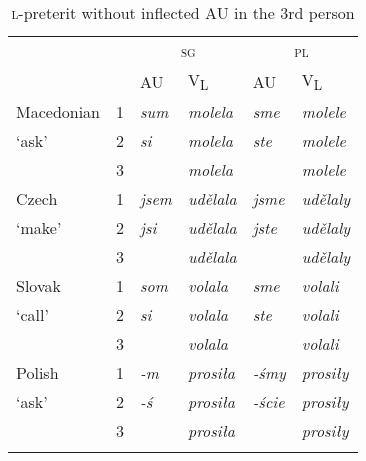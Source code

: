 \documentclass[output=paper]{langscibook}
\begin{document}

\begin{table}
\begin{tabular}{llllll}
\lsptoprule
& & \multicolumn{2}{c}{\textsc{sg}} & \multicolumn{2}{c}{\textsc{pl}} \\\cmidrule(lr){3-4}\cmidrule(lr){5-6}
& & AU & V\textsubscript{L} & AU & V\textsubscript{L} \\
\midrule
Macedonian & 1 & \textit{sum} & \textit{molela} & \textit{sme} & \textit{molele} \\ 
`ask'    & 2 & \textit{si} & \textit{molela} & \textit{ste} & \textit{molele} \\ 
    & 3 & & \textit{molela} & & \textit{molele} \\\addlinespace
Czech & 1 & \textit{jsem} & \textit{udělala} & \textit{jsme} & \textit{udělaly} \\ 
`make'            & 2 & \textit{jsi} & \textit{udělala} & \textit{jste} & \textit{udělaly} \\ 
            & 3 & & \textit{udělala} & & \textit{udělaly} \\\addlinespace
Slovak & 1 & \textit{som} & \textit{volala} & \textit{sme} & \textit{volali} \\ 
`call'            & 2 & \textit{si} & \textit{volala} & \textit{ste} & \textit{volali} \\ 
            & 3 & & \textit{volala} & & \textit{volali} \\\addlinespace
Polish & 1 & \textit{-m} & \textit{prosiła} & \textit{-śmy} & \textit{prosiły} \\ 
`ask'            & 2 & \textit{-ś} & \textit{prosiła} & \textit{-ście} & \textit{prosiły} \\ 
            & 3 & & \textit{prosiła} & & \textit{prosiły} \\ 
\lspbottomrule
\end{tabular}
\caption{\textsc{l-}preterit without inflected AU in the 3rd person}
\label{pitsch:tab:perfect_3rd}
\end{table}

\end{document}
